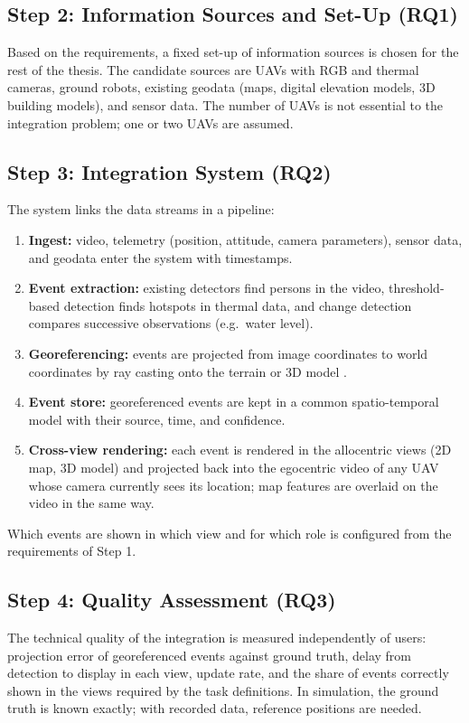 \documentclass{article}
\begin{document}
\subsection{Step 2: Information Sources and Set-Up (RQ1)}
Based on the requirements, a fixed set-up of information sources is chosen for the rest of the thesis.
The candidate sources are UAVs with RGB and thermal cameras, ground robots, existing geodata (maps, digital elevation models, 3D building models), and sensor data.
The number of UAVs is not essential to the integration problem; one or two UAVs are assumed.


\subsection{Step 3: Integration System (RQ2)}
The system links the data streams in a pipeline:
\begin{enumerate}
  \item \textbf{Ingest:} video, telemetry (position, attitude, camera parameters), sensor data, and geodata enter the system with timestamps.
  \item \textbf{Event extraction:} existing detectors find persons in the video, threshold-based detection finds hotspots in thermal data, and change detection compares successive observations (e.g.\ water level).
  \item \textbf{Georeferencing:} events are projected from image coordinates to world coordinates by ray casting onto the terrain or 3D model \cite{paulin2023raycast, carvalho2025geolocation}.
  \item \textbf{Event store:} georeferenced events are kept in a common spatio-temporal model with their source, time, and confidence.
  \item \textbf{Cross-view rendering:} each event is rendered in the allocentric views (2D map, 3D model) and projected back into the egocentric video of any UAV whose camera currently sees its location; map features are overlaid on the video in the same way.
\end{enumerate}
Which events are shown in which view and for which role is configured from the requirements of Step 1.

\subsection{Step 4: Quality Assessment (RQ3)}
The technical quality of the integration is measured independently of users:
projection error of georeferenced events against ground truth, delay from detection to display in each view, update rate, and the share of events correctly shown in the views required by the task definitions.
In simulation, the ground truth is known exactly; with recorded data, reference positions are needed.
\end{document}
